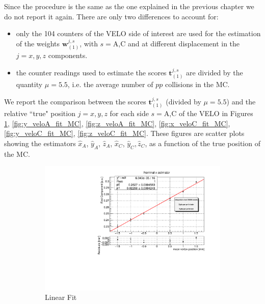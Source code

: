 Since the procedure is the same as the one explained in the previous chapter we do not report it again. There are only two differences to account for:
\begin{itemize}
    \item only the 104 counters of the VELO side of interest are used for the estimation of the weights $\mathbf{w}^{j,s}_{(1)}$, with $s=$A,C and at different displacement in the $j=x,y,z$ components.
    \item the counter readings used to estimate the scores $\mathbf{t}^{j,s}_{(1)}$ are divided by the quantity $\mu=5.5$, i.e. the average number of $pp$ collisions in the MC.
\end{itemize}
We report the comparison between the scores $\mathbf{t}^{j,s}_{(1)}$ (divided by $\mu=5.5$) and the relative ``true" position $j=x,y,z$ for each side $s=$A,C of the VELO in Figures \ref{fig:x_veloA_fit_MC}, \ref{fig:y_veloA_fit_MC}, \ref{fig:z_veloA_fit_MC}, \ref{fig:x_veloC_fit_MC}, \ref{fig:y_veloC_fit_MC}, \ref{fig:z_veloC_fit_MC}. These figures are scatter plots showing the estimators $\hat{x}_A$, $\hat{y}_A$, $\hat{z}_A$, $\hat{x}_C$, $\hat{y}_C$$, \hat{z}_C$,  as a function of the true position of the MC.
\begin{figure}
    \centering
    \begin{subfigure}{0.48\textwidth}
    \includegraphics[width=\linewidth]{figures/x_fit_veloA_MC_normalized.pdf}
    \caption{Linear Fit}\label{fig:x_veloA_fit_MC}
    \end{subfigure}
    \begin{subfigure}{0.48\textwidth}

\end{subfigure}
\end{figure}$$
